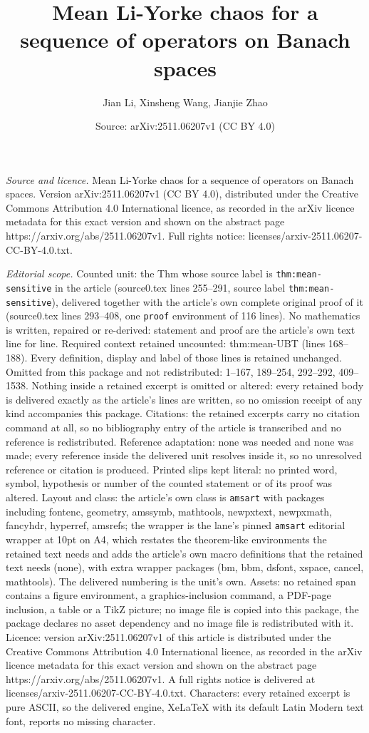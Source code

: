 \documentclass[10pt,a4paper]{amsart}
\title[Mean Li-Yorke chaos for a sequence of operators on Banach sp]{Mean Li-Yorke chaos for a sequence of operators on Banach spaces}
\author{Jian Li, Xinsheng Wang, Jianjie Zhao}
\date{Source: arXiv:2511.06207v1 (CC BY 4.0)}
\begin{document}
\maketitle

\noindent\emph{Source and licence.} Mean Li-Yorke chaos for a sequence of operators on Banach spaces. Version arXiv:2511.06207v1 (CC BY 4.0), distributed under the Creative Commons Attribution 4.0 International licence, as recorded in the arXiv licence metadata for this exact version and shown on the abstract page https://arxiv.org/abs/2511.06207v1. Full rights notice: licenses/arxiv-2511.06207-CC-BY-4.0.txt.\par\smallskip

\noindent\textit{Editorial scope.} Counted unit: the Thm whose source label is \texttt{thm:mean-sensitive} in the article (source0.tex lines 255--291, source label \texttt{thm:mean-sensitive}), delivered together with the article's own complete original proof of it (source0.tex lines 293--408, one \texttt{proof} environment of 116 lines). No mathematics is written, repaired or re-derived: statement and proof are the article's own text line for line. Required context retained uncounted: thm:mean-UBT (lines 168--188). Every definition, display and label of those lines is retained unchanged. Omitted from this package and not redistributed: 1--167, 189--254, 292--292, 409--1538. Nothing inside a retained excerpt is omitted or altered: every retained body is delivered exactly as the article's lines are written, so no omission receipt of any kind accompanies this package. Citations: the retained excerpts carry no citation command at all, so no bibliography entry of the article is transcribed and no reference is redistributed. Reference adaptation: none was needed and none was made; every reference inside the delivered unit resolves inside it, so no unresolved reference or citation is produced. Printed slips kept literal: no printed word, symbol, hypothesis or number of the counted statement or of its proof was altered. Layout and class: the article's own class is \texttt{amsart} with packages including fontenc, geometry, amssymb, mathtools, newpxtext, newpxmath, fancyhdr, hyperref, amsrefs; the wrapper is the lane's pinned \texttt{amsart} editorial wrapper at 10pt on A4, which restates the theorem-like environments the retained text needs and adds the article's own macro definitions that the retained text needs (none), with extra wrapper packages (bm, bbm, dsfont, xspace, cancel, mathtools). The delivered numbering is the unit's own. Assets: no retained span contains a figure environment, a graphics-inclusion command, a PDF-page inclusion, a table or a TikZ picture; no image file is copied into this package, the package declares no asset dependency and no image file is redistributed with it. Licence: version arXiv:2511.06207v1 of this article is distributed under the Creative Commons Attribution 4.0 International licence, as recorded in the arXiv licence metadata for this exact version and shown on the abstract page https://arxiv.org/abs/2511.06207v1. A full rights notice is delivered at licenses/arxiv-2511.06207-CC-BY-4.0.txt. Characters: every retained excerpt is pure ASCII, so the delivered engine, XeLaTeX with its default Latin Modern text font, reports no missing character.
\end{document}
